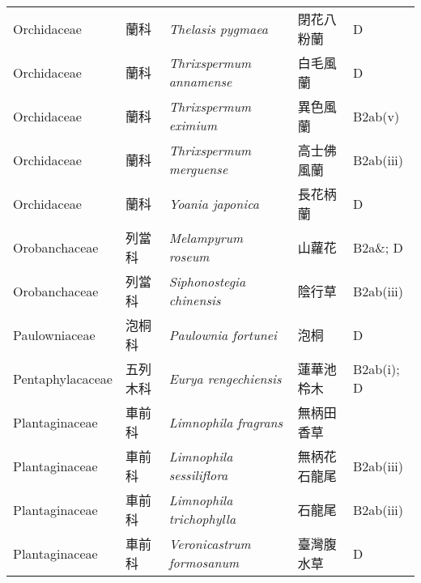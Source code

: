 {\begin{longtable}{p{2.5cm}p{2.5cm}p{4.5cm}p{2.5cm}p{3cm}}
    Orchidaceae & 蘭科 & \textit{Thelasis pygmaea}  & 閉花八粉蘭 & D \index{Thelasis@\textit{Thelasis}!pygmaea@\textit{pygmaea}}  \index{閉花八粉蘭} \\
    Orchidaceae & 蘭科 & \textit{Thrixspermum annamense}  & 白毛風蘭 & D \index{Thrixspermum@\textit{Thrixspermum}!annamense@\textit{annamense}}  \index{白毛風蘭} \\
    Orchidaceae & 蘭科 & \textit{Thrixspermum eximium}  & 異色風蘭 & B2ab(v) \index{Thrixspermum@\textit{Thrixspermum}!eximium@\textit{eximium}}  \index{異色風蘭} \\
    Orchidaceae & 蘭科 & \textit{Thrixspermum merguense}  & 高士佛風蘭 & B2ab(iii) \index{Thrixspermum@\textit{Thrixspermum}!merguense@\textit{merguense}}  \index{高士佛風蘭} \\
    Orchidaceae & 蘭科 & \textit{Yoania japonica}  & 長花柄蘭 & D \index{Yoania@\textit{Yoania}!japonica@\textit{japonica}}  \index{長花柄蘭} \\
    Orobanchaceae & 列當科 & \textit{Melampyrum roseum}  & 山蘿花 & B2a\&; D \index{Melampyrum@\textit{Melampyrum}!roseum@\textit{roseum}}  \index{山蘿花} \\
    Orobanchaceae & 列當科 & \textit{Siphonostegia chinensis}  & 陰行草 & B2ab(iii) \index{Siphonostegia@\textit{Siphonostegia}!chinensis@\textit{chinensis}}  \index{陰行草} \\
    Paulowniaceae & 泡桐科 & \textit{Paulownia fortunei}  & 泡桐 & D \index{Paulownia@\textit{Paulownia}!fortunei@\textit{fortunei}}  \index{泡桐} \\
    Pentaphylacaceae & 五列木科 & \textit{Eurya rengechiensis}  & 蓮華池柃木 & B2ab(i); D \index{Eurya@\textit{Eurya}!rengechiensis@\textit{rengechiensis}}  \index{蓮華池柃木} \\
    Plantaginaceae & 車前科 & \textit{Limnophila fragrans}  & 無柄田香草 &  \index{Limnophila@\textit{Limnophila}!fragrans@\textit{fragrans}}  \index{無柄田香草} \\
    Plantaginaceae & 車前科 & \textit{Limnophila sessiliflora}  & 無柄花石龍尾 & B2ab(iii) \index{Limnophila@\textit{Limnophila}!sessiliflora@\textit{sessiliflora}}  \index{無柄花石龍尾} \\
    Plantaginaceae & 車前科 & \textit{Limnophila trichophylla}  & 石龍尾 & B2ab(iii) \index{Limnophila@\textit{Limnophila}!trichophylla@\textit{trichophylla}}  \index{石龍尾} \\
    Plantaginaceae & 車前科 & \textit{Veronicastrum formosanum}  & 臺灣腹水草 & D \index{Veronicastrum@\textit{Veronicastrum}!formosanum@\textit{formosanum}}  \index{臺灣腹水草} \\

\end{longtable}}

